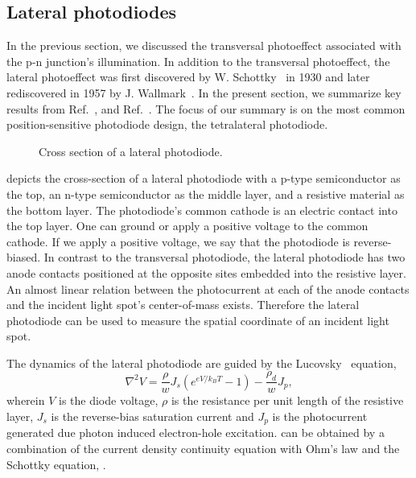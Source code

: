 \subsection{Lateral photodiodes}

In the previous section, we discussed the transversal photoeffect associated with the p-n junction's illumination.
In addition to the transversal photoeffect, the lateral photoeffect was first discovered by W. Schottky~\cite{Schottky30} in 1930 and later rediscovered in 1957 by J. Wallmark~\cite{Wallmark57}.
In the present section, we summarize key results from Ref.~\cite{Noorlag74}, and Ref.~\cite{Woltring75}. The focus of our summary is on the most common position-sensitive photodiode design, the tetralateral photodiode.
\begin{figure}[H]
	\centering
	
	\caption{Cross section of a lateral photodiode.}\label{fig:lateral_photodiode_cross_section}
\end{figure}
 depicts the cross-section of a lateral photodiode with a p-type semiconductor as the top, an n-type semiconductor as the middle layer, and a resistive material as the bottom layer.
The photodiode's common cathode is an electric contact into the top layer.
One can ground or apply a positive voltage to the common cathode. If we apply a positive voltage, we say that the photodiode is reverse-biased.
In contrast to the transversal photodiode, the lateral photodiode has two anode contacts positioned at the opposite sites embedded into the resistive layer.
An almost linear relation between the photocurrent at each of the anode contacts and the incident light spot's center-of-mass exists.
Therefore the lateral photodiode can be used to measure the spatial coordinate of an incident light spot.

The dynamics of the lateral photodiode are guided by the Lucovsky~\cite{Lucovsky60} equation,
\begin{equation}
	\nabla^2V=\frac{\rho}{w}J_s\left(e^{eV/k_BT}-1\right)-\frac{\rho_d}{w}J_p\label{eq:lucovsky_exact},
\end{equation}
wherein $V$ is the diode voltage, $\rho$ is the resistance per unit length of the resistive layer, $J_s$ is the reverse-bias saturation current and $J_p$ is the photocurrent generated due photon induced electron-hole excitation.
 can be obtained by a combination of the current density continuity equation with Ohm's law and the Schottky equation, .

